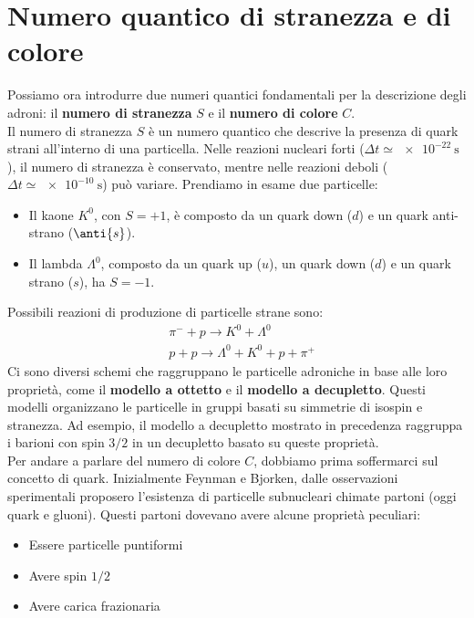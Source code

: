 \section{Numero quantico di stranezza e di colore}
Possiamo ora introdurre due numeri quantici fondamentali per la descrizione degli adroni: il \textbf{numero di stranezza} $S$ e il \textbf{numero di colore} $C$.\\
Il numero di stranezza $S$ è un numero quantico che descrive la presenza di quark strani all'interno di una particella. Nelle reazioni nucleari forti ($\Delta t \simeq \qty{e-22}{\second}$), il numero di stranezza è conservato, mentre nelle reazioni deboli ($\Delta t \simeq \qty{e-10}{\second}$) può variare. Prendiamo in esame due particelle:
\begin{itemize}
    \item Il kaone $K^0$, con $S=+1$, è composto da un quark down ($d$) e un quark anti-strano ($\anti{s}$).
    \item Il lambda $\Lambda^0$, composto da un quark up ($u$), un quark down ($d$) e un quark strano ($s$), ha $S=-1$.
\end{itemize}
Possibili reazioni di produzione di particelle strane sono:
\begin{equation}
    \begin{split}
      &\pi^- + p \to K^0 + \Lambda^0 \\[8pt]
      &p + p \to \Lambda^0 + K^0 + p + \pi^+
    \end{split}
\end{equation}
Ci sono diversi schemi che raggruppano le particelle adroniche in base alle loro proprietà, come il \textbf{modello a ottetto} e il \textbf{modello a decupletto}. Questi modelli organizzano le particelle in gruppi basati su simmetrie di isospin e stranezza. Ad esempio, il modello a decupletto mostrato in precedenza raggruppa i barioni con spin $3/2$ in un decupletto basato su queste proprietà.\\
Per andare a parlare del numero di colore $C$, dobbiamo prima soffermarci sul concetto di quark. Inizialmente Feynman e Bjorken, dalle osservazioni sperimentali proposero l'esistenza di particelle subnucleari chimate partoni (oggi quark e gluoni). Questi partoni dovevano avere alcune proprietà peculiari:
\begin{itemize}
    \item Essere particelle puntiformi
    \item Avere spin $1/2$
    \item Avere carica frazionaria
\end{itemize}
